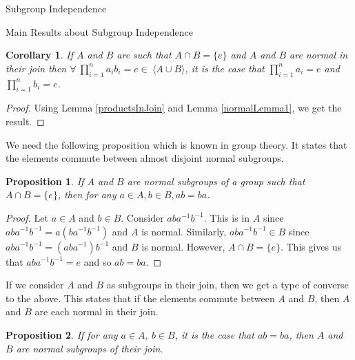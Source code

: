 \documentclass{article}
\newtheorem{proposition}{Proposition}[section]
\newtheorem{corollary}{Corollary}[section]
\begin{document}
\begin{section}{Subgroup Independence}
\begin{subsection}{Main Results about Subgroup Independence}
			\begin{corollary}\label{normalLemma2}
				If $A$ and $B$ are such that $A \cap B = \{e\}$ and $A$ and $B$ are normal in their join then $\forall \  \prod_{i=1}^{n}a_ib_i = e \in \ \langle A \cup B\rangle $, it is the case that $\prod_{i=1}^{n}a_i = e$ and $\prod_{i=1}^{n}b_i= e$.
				
			\end{corollary}
			
			\begin{proof}
				Using Lemma \ref{productsInJoin} and Lemma \ref{normalLemma1}, we get the result.	
			\end{proof}
			
			
			
			
			
			\noindent We need the following proposition which is known in group theory. It states that the elements commute between almost disjoint normal subgroups.
			
			\begin{proposition}\label{normal-subgroups-and-commuting-elements-1}
				If $A$ and $B$ are normal subgroups of a group such that $A \cap B = \{e\}$, then  for any $a \in A, b\in B , ab = ba$.
			\end{proposition}
			
			\begin{proof}
				Let $a \in A$ and $b \in B$. Consider $aba^{-1}b^{-1}$. This is in $A$ since $aba^{-1}b^{-1} = a(ba^{-1}b^{-1})$ and $A$ is normal. Similarly, $aba^{-1}b^{-1} \in B$ since $aba^{-1}b^{-1} = (aba^{-1})b^{-1}$ and $B$ is normal. However, $A \cap B = \{e\}.$ This gives us that $aba^{-1}b^{-1} = e$ and so $ab = ba$.
			\end{proof}
			
			\noindent If we consider $A$ and $B$ as subgroups in their join, then we get a type of converse to the above. This states that if the elements commute between $A$ and $B$, then $A$ and $B$ are each normal in their join.
			
			\begin{proposition}\label{normal-subgroups-and-commuting-elements-2}
				If for any $a \in A$, $b \in B$, it is the case that $ab = ba$, then $A$ and $B$ are normal subgroups of their join. 
			\end{proposition}	
			

\end{subsection}
\end{section}
\end{document}
